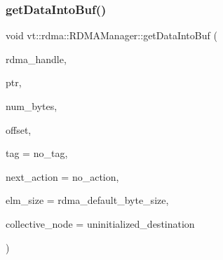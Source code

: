 \mbox{\label{structvt_1_1rdma_1_1_r_d_m_a_manager_aa97aeb2fee7d1a1b2228ff063d64eb5f}} 
\subsubsection{\texorpdfstring{get\+Data\+Into\+Buf()}{getDataIntoBuf()}}
{\footnotesize\ttfamily void vt\+::rdma\+::\+R\+D\+M\+A\+Manager\+::get\+Data\+Into\+Buf (\begin{DoxyParamCaption}\item[{\hyperlink{namespacevt_a10442579ec4e7ebef223818e64bcf908}{R\+D\+M\+A\+\_\+\+Handle\+Type} const \&}]{rdma\+\_\+handle,  }\item[{\hyperlink{namespacevt_a9e2c953286c7616f7c218e9951790776}{R\+D\+M\+A\+\_\+\+Ptr\+Type} const \&}]{ptr,  }\item[{\hyperlink{namespacevt_aab8d55968084610ce3b17057981e9300}{Byte\+Type} const \&}]{num\+\_\+bytes,  }\item[{\hyperlink{namespacevt_aab8d55968084610ce3b17057981e9300}{Byte\+Type} const \&}]{offset,  }\item[{\hyperlink{namespacevt_a84ab281dae04a52a4b243d6bf62d0e52}{Tag\+Type} const \&}]{tag = {\ttfamily no\+\_\+tag},  }\item[{\hyperlink{namespacevt_ae0a5a7b18cc99d7b732cb4d44f46b0f3}{Action\+Type}}]{next\+\_\+action = {\ttfamily no\+\_\+action},  }\item[{\hyperlink{namespacevt_aab8d55968084610ce3b17057981e9300}{Byte\+Type} const \&}]{elm\+\_\+size = {\ttfamily rdma\+\_\+default\+\_\+byte\+\_\+size},  }\item[{\hyperlink{namespacevt_a866da9d0efc19c0a1ce79e9e492f47e2}{Node\+Type} const \&}]{collective\+\_\+node = {\ttfamily uninitialized\+\_\+destination} }\end{DoxyParamCaption})}

\mbox{\label{structvt_1_1rdma_1_1_r_d_m_a_manager_a68bf3378ec4132a81b728c180aa63686}} 
